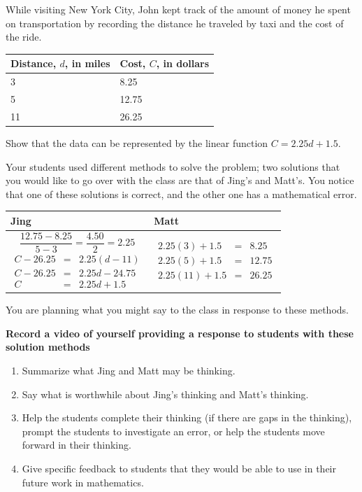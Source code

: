 \documentclass[11pt]{article}
\theoremstyle{definition}
\begin{document}
\begin{center}
\begin{minipage}{0.85\textwidth}
While visiting New York City, John kept track of the amount of money he spent on transportation by recording the distance he traveled by taxi and the cost of the ride.

\begin{center}
\begin{tabular}{C{1.2in}|C{1in}}
Distance, $d$, in miles & Cost, $C$, in dollars \\ 
 & 8.25 \\
5 & 12.75 \\
11 & 26.25 \\
\end{tabular}
\end{center}

Show that the data can be represented by the linear function $C=2.25d+1.5$.
\end{minipage}
\end{center}

Your students used different methods to solve the problem; two solutions that you would like to go over with the class are that of Jing's and Matt's. You notice that one of these solutions is correct, and the other one has a mathematical error.
 
 \begin{tabular}{C{0.45\textwidth}|C{0.4\textwidth}}
 Jing & Matt  \\ 
 \hline 
$$  \frac{12.75 - 8.25 }{5-3}=\frac{4.50}{2}=2.25  $$
 \begin{eqnarray*} 
 C-26.25&=&2.25 (d-11) \\ 
C - 26.25 &=& 2.25d - 24.75\\
C &=& 2.25d + 1.5
 \end{eqnarray*}
  & 
   \begin{eqnarray*} 
  2.25 (3) + 1.5 &=& 8.25\\
2.25 (5) + 1.5& = &12.75 \\
  2.25 (11) + 1.5 &=& 26.25
   \end{eqnarray*}
 \end{tabular}

You are planning what you might say to the class in response to these methods. 

{\bf Record a video of yourself providing a response to students with these solution methods}

\begin{enumerate}
\item Summarize what Jing and Matt may be thinking.
\item Say what is worthwhile about Jing's thinking and Matt's thinking.
\item Help the students complete their thinking (if there are gaps in the thinking), prompt the students to investigate an error, or help the students move forward in their thinking.
\item Give specific feedback to students that they would be able to use in their future work in mathematics.
\end{enumerate}
\end{document}
